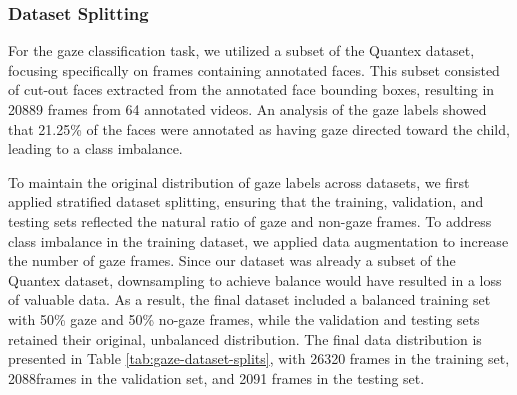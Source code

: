 \documentclass[
  man,floatsintext]{apa6}
\begin{document}
\subsubsection{Dataset Splitting}\label{dataset-splitting-1}

For the gaze classification task, we utilized a subset of the Quantex dataset, focusing specifically on frames containing annotated faces. This subset consisted of cut-out faces extracted from the annotated face bounding boxes, resulting in 20889 frames from 64 annotated videos. An analysis of the gaze labels showed that 21.25\% of the faces were annotated as having gaze directed toward the child, leading to a class imbalance.

To maintain the original distribution of gaze labels across datasets, we first applied stratified dataset splitting, ensuring that the training, validation, and testing sets reflected the natural ratio of gaze and non-gaze frames. To address class imbalance in the training dataset, we applied data augmentation to increase the number of gaze frames. Since our dataset was already a subset of the Quantex dataset, downsampling to achieve balance would have resulted in a loss of valuable data. As a result, the final dataset included a balanced training set with 50\% gaze and 50\% no-gaze frames, while the validation and testing sets retained their original, unbalanced distribution. The final data distribution is presented in Table \ref{tab:gaze-dataset-splits}, with 26320 frames in the training set, 2088frames in the validation set, and 2091 frames in the testing set.
\end{document}
